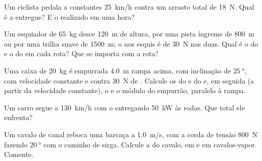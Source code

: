 \begin{exercise}[$\star\star$]\label{exo:g11:work-of-force:7}
Um ciclista pedala a constantes \qty{25}{km/h} contra um arrasto total de
\qty{18}{N}. Qual é a  entregue? E o  realizado em uma
hora?
\end{exercise}

\begin{exercise}[$\star\star$]\label{exo:g11:work-of-force:8}
Um esquiador de \qty{65}{kg} desce \qty{120}{m} de altura, por uma pista
íngreme de \qty{800}{m} ou por uma trilha suave de \qty{1500}{m}; o
 nos esquis é de \qty{30}{N} nas duas. Qual é o  do  e
o do  em cada rota? Que  se importa com a rota?
\end{exercise}

\begin{exercise}[$\star\star$]\label{exo:g11:work-of-force:9}
Uma caixa de \qty{20}{kg} é empurrada \qty{4.0}{m} rampa acima, com
inclinação de $\qty{25}{\degree}$, com velocidade constante e contra
\qty{30}{N} de . Calcule os  do  e do  e, em
seguida (a partir da velocidade constante), o  e o módulo do
empurrão, paralelo à rampa.
\end{exercise}

\begin{exercise}[$\star\star$]\label{exo:g11:work-of-force:10}
Um carro segue a \qty{130}{km/h} com o  entregando \qty{50}{kW} às
rodas. Que   total ele enfrenta?
\end{exercise}

\begin{exercise}[$\star\star$]\label{exo:g11:work-of-force:11}
Um cavalo de canal reboca uma barcaça a \qty{1.0}{m/s}, com a corda de
tensão \qty{800}{N} fazendo $\qty{20}{\degree}$ com o caminho de sirga.
Calcule a  do cavalo, em  e em cavalos-vapor. Comente.
\end{exercise}


